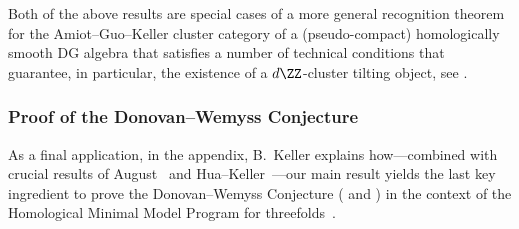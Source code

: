 \documentclass[a4paper]{amsart}
\begin{document}
Both of the above results are special cases of a more general recognition
theorem for the Amiot--Guo--Keller cluster category of a (pseudo-compact)
homologically smooth DG algebra that satisfies a number of technical conditions
that guarantee, in particular, the existence of a $d\ZZ$-cluster tilting object,
see .

\subsubsection*{Proof of the Donovan--Wemyss Conjecture}

As a final application, in the appendix, B.~Keller explains how---combined with
crucial results of August~\cite{Aug20a} and Hua--Keller~\cite{HK23+}---our main
result yields the last key ingredient to prove the Donovan--Wemyss Conjecture
(\cite[Conj.~1.4]{DW16} and \cite[Conj.~1.3]{Aug20a}) in the
context of the Homological Minimal Model Program for threefolds~\cite{Wem18}.
\end{document}

